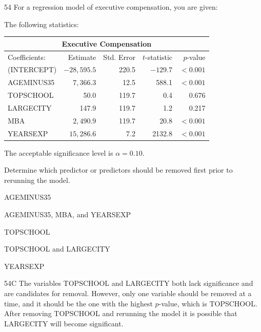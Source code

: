 \begin{question}{54}
For a regression model of executive compensation, you are given:
\begin{given}
\item The following statistics:

\begin{center}
\begin{tabular}{|l|r|r|r|r|}
\hline
\multicolumn{5}{|c|}{Executive Compensation} \\ \hline
Coefficients: & Estimate & Std. Error & $t$-statistic & $p$-value \\ \hline
(INTERCEPT) & $-28{,}595.5$ & 220.5 & $-129.7$ & $<0.001$ \\ \hline
AGEMINUS35 & $7{,}366.3$ & 12.5 & 588.1 & $<0.001$ \\ \hline
TOPSCHOOL & 50.0 & 119.7 & 0.4 & 0.676 \\ \hline
LARGECITY & 147.9 & 119.7 & 1.2 & 0.217 \\ \hline
MBA & $2{,}490.9$ & 119.7 & 20.8 & $<0.001$ \\ \hline
YEARSEXP & $15{,}286.6$ & 7.2 & 2132.8 & $<0.001$ \\ \hline
\end{tabular}
\end{center}

\item The acceptable significance level is $\alpha = 0.10$.
\end{given}

Determine which predictor or predictors should be removed first prior to rerunning the model.

\begin{choices}
\item AGEMINUS35
\item AGEMINUS35, MBA, and YEARSEXP
\item TOPSCHOOL
\item TOPSCHOOL and LARGECITY
\item YEARSEXP
\end{choices}
\end{question}
\begin{solution}{54}{C}
The variables TOPSCHOOL and LARGECITY both lack significance and are candidates for removal. However, only one variable should be removed at a time, and it should be the one with the highest $p$-value, which is TOPSCHOOL. After removing TOPSCHOOL and rerunning the model it is possible that LARGECITY will become significant.
\end{solution}

